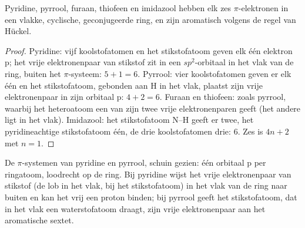 \begin{proposition}\label{prop:b3:heterocycles:sextet}
Pyridine, pyrrool, furaan, thiofeen en imidazool hebben elk zes $\pi$-elektronen in
een vlakke, cyclische, geconjugeerde ring, en zijn aromatisch volgens de
regel van Hückel.
\end{proposition}

\begin{proof}
Pyridine: vijf koolstofatomen en het stikstofatoom geven elk één
elektron p; het vrije elektronenpaar van stikstof zit in een $sp^2$-orbitaal in het vlak van de ring, buiten het $\pi$-systeem: $5 + 1 = 6$.
Pyrrool: vier koolstofatomen geven er elk één en het stikstofatoom,
gebonden aan H in het vlak, plaatst zijn vrije elektronenpaar in zijn orbitaal p: $4 + 2 = 6$. Furaan en thiofeen: zoals pyrrool, waarbij het
heteroatoom een van zijn twee vrije elektronenparen geeft (het andere
ligt in het vlak). Imidazool:
het stikstofatoom N--H geeft er twee, het pyridineachtige stikstofatoom
één, de drie koolstofatomen drie: 6. Zes is $4n + 2$ met $n = 1$.
\end{proof}

\begin{omfigure}

{\small De $\pi$-systemen van pyridine en pyrrool, schuin gezien: één orbitaal p per
ringatoom, loodrecht op de ring. Bij pyridine wijst het vrije
elektronenpaar van stikstof (de lob in het vlak, bij het stikstofatoom)
in het vlak van de ring naar buiten en kan het vrij een proton binden;
bij pyrrool geeft het stikstofatoom, dat in het vlak een waterstofatoom
draagt, zijn vrije elektronenpaar aan het aromatische sextet.}
\end{omfigure}


